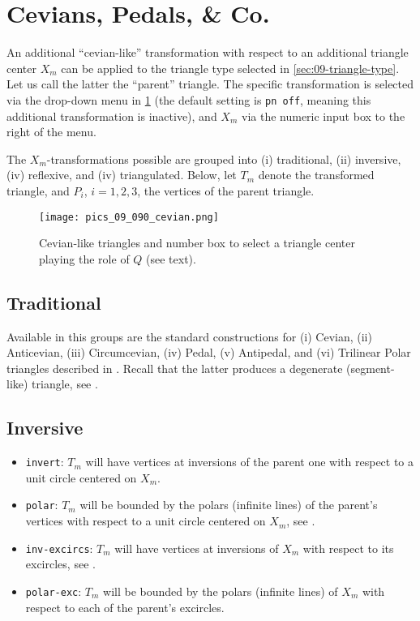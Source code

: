 \section{Cevians, Pedals, \& Co.}
\label{sec:09-cevian}

An additional ``cevian-like'' transformation with respect to an additional triangle center $X_m$ can be applied to the triangle type selected in \cref{sec:09-triangle-type}. Let us call the latter the ``parent'' triangle.
The specific transformation is selected via the drop-down menu in \cref{fig:09-menu-cevian} (the default setting is \texttt{pn off}, meaning this additional transformation is inactive), and $X_m$ via the numeric input box to the right of the menu.

The $X_m$-transformations possible are grouped into (i) traditional, (ii) inversive, (iv) reflexive, and (iv) triangulated. Below, let $T_m$ denote the transformed triangle, and $P_i$, $i=1,2,3$, the vertices of the parent triangle.

\begin{figure}
    \centering
    \texttt{[image: pics\_09\_090\_cevian.png]}
    \caption{Cevian-like triangles and number box to select a triangle center playing the role of $Q$ (see text).}
    \label{fig:09-menu-cevian}
\end{figure}

\subsection{Traditional}

Available in this groups are the standard constructions for (i) Cevian,  (ii) Anticevian, (iii) Circumcevian, (iv) Pedal, (v) Antipedal, and (vi) Trilinear Polar triangles described in \cite{mw}. Recall that the latter produces a degenerate (segment-like) triangle, see \cite[Trilinear Polar]{mw}.

\subsection{Inversive}

\begin{itemize}
\item \texttt{invert}: $T_m$ will have vertices at inversions of the parent one with respect to a unit circle centered on $X_m$.
\item \texttt{polar}: $T_m$ will be bounded by the polars (infinite lines) of the parent's vertices with respect to a unit circle centered on $X_m$, see \cite[Polar]{mw}.
\item \texttt{inv-excircs}: $T_m$ will have vertices at inversions of $X_m$ with respect to its excircles, see \cite[Excircle]{mw}. 
\item \texttt{polar-exc}: $T_m$ will be bounded by the polars (infinite lines) of $X_m$ with respect to each of the parent's excircles. 
\end{itemize}


